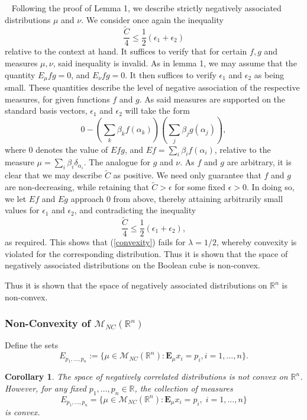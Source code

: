\documentclass[11pt]{article}
\newcommand{\E}{\mathbf{E}}
\newcommand{\R}{\mathbb{R}}
\newcommand{\m}{\mathcal{M}}
\newtheorem{cor}{Corollary}
\newenvironment{Proof}{\noindent{\bf Proof} \ }{\QED}\smallskip
\newcommand\QED{\newline \rightline{$\blacksquare$} \bigskip}
\begin{document}
\begin{Proof}
Following the proof of Lemma 1, we describe strictly negatively associated distributions $\mu$ and $\nu$. We consider once again the inequality 
\[
\frac{\tilde{C}}{4} \leq \frac{1}{2}(\epsilon_1+\epsilon_2)
\]
relative to the context at hand. It suffices to verify that for certain $f,g$ and measures $\mu, \nu$, said inequality is invalid. As in lemma 1, we may assume that the quantity $E_{\mu}fg =0$, and $E_{\nu}fg = 0$. It then suffices to verify $\epsilon_1$ and $\epsilon_2$ as being small. These quantities describe the level of negative association of the respective measures, for given functions $f$ and $g$. As said measures are supported on the standard basis vectors, $\epsilon_1$ and $\epsilon_2$ will take the form
\[
0-\left(\sum_k \beta_k f(\alpha_k)\right)\left( \sum_j \beta_j g(\alpha_j)\right),
\]
where 0 denotes the value of $E fg$, and $Ef = \sum_i\beta_i f(\alpha_i)$, relative to the measure $\mu = \sum_i\beta_i \delta_{\alpha_i}$. The analogue for $g$ and $\nu$. As $f$ and $g$ are arbitrary, it is clear that we may describe $\tilde{C}$ as positive. We need only guarantee that $f$ and $g$ are non-decreasing, while retaining that $\tilde{C}>\epsilon$ for some fixed $\epsilon>0$. In doing so, we let $Ef$ and $Eg$ approach 0 from above, thereby attaining arbitrarily small values for $\epsilon_1$ and $\epsilon_2$, and contradicting the inequality 
\[
\frac{\tilde{C}}{4} \leq \frac{1}{2}(\epsilon_1+\epsilon_2),
\]
as required. This shows that (\ref{convexity}) fails for $\lambda=1/2$, whereby convexity is violated for the corresponding distribution.
Thus it is shown that the space of negatively associated distributions on the Boolean cube is non-convex.

Thus it is shown that the space of negatively associated distributions on $\R^n$ is non-convex.
\end{Proof}

\subsubsection{Non-Convexity of $\m_{NC}(\R^n)$}
Define
the sets 
\begin{equation}\label{convexset}
E_{p_1,\dots, p_n} := \{\mu\in \m_{NC}(\R^n) :
\E_{\mu} x_i = p_i, i=1,\dots, n\}.
\end{equation}

\begin{cor}\label{NCCONVEX}
The space of negatively correlated distributions is not convex on $\R^n$. However, for any fixed $p_1,\dots, p_n\in \R$, the collection of measures
\[
E_{p_1,\dots,p_n} = \{\mu\in \m_{NC}(\R^n) : \E_{\mu} x_i = p_i,\; i=1,\dots,n\}
\]
is convex. 
\end{cor}
\end{document}
